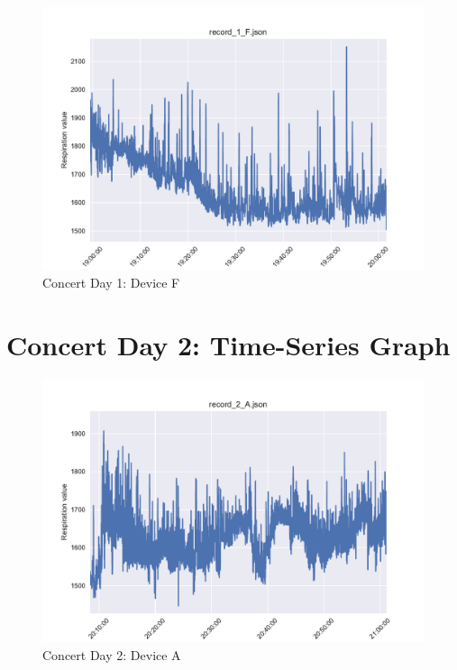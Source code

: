 \begin{figure}
    \centering
    \includegraphics[scale=0.6]{images/record_1_f.pdf}
    \caption{Concert Day 1: Device F}
    \label{fig:concert_day1_f}
\end{figure}

\section{Concert Day 2: Time-Series Graph}


\begin{figure}
    \centering
    \includegraphics[scale=0.6]{images/record_2_a.pdf}
    \caption{Concert Day 2: Device A}
    \label{fig:concert_day2_a}
\end{figure}

